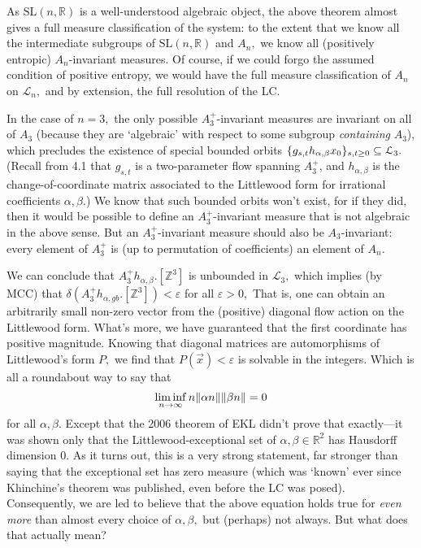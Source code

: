\documentclass[12pt, letterpaper, oneside]{book}
\newcommand{\ga}{\ensuremath{\alpha}}
\newcommand{\gb}{\ensuremath{\beta}}
\newcommand{\gd}{\ensuremath{\delta}}
\renewcommand{\ge}{\ensuremath{\varepsilon}}
\newcommand{\R}{\mathbb{R}}
\newcommand{\Z}{\mathbb{Z}}
\DeclarePairedDelimiter{\norm}{\lVert}{\rVert}
\DeclarePairedDelimiter{\set}{\lbrace}{\rbrace}
\theoremstyle{plain}
\theoremstyle{definition}
\theoremstyle{remark}
\begin{document}
As $\mbox{SL}(n,\R)$ is a well-understood algebraic object, the above theorem almost gives a full measure classification of the system: to the extent that we know all the intermediate subgroups of $\mbox{SL}(n,\R)$ and $A_n,$ we know all (positively entropic) $A_n$-invariant measures. Of course, if we could forgo the assumed condition of positive entropy, we would have the full measure classification of $A_n$ on $\mathcal{L}_n,$ and by extension, the full resolution of the LC. 

In the case of $n = 3,$ the only possible $A_3^{+}$-invariant measures are invariant on all of $A_3$ (because they are `algebraic' with respect to some subgroup \textit{containing} $A_3$), which precludes the existence of special bounded orbits $\set{g_{s,t}h_{\ga,\gb}x_0}_{s,t\geq0}  \subseteq \mathcal{L}_3.$ (Recall from 4.1 that $g_{s,t}$ is a two-parameter flow spanning $A_3^{+}$, and $h_{\ga,\gb}$ is the change-of-coordinate matrix associated to the Littlewood form for irrational coefficients $\ga,\gb.$) We know that such bounded orbits won't exist, for if they did, then it would be possible to define an $A_3^{+}$-invariant measure that is not algebraic in the above sense. But an $A_3^{+}$-invariant measure should also be $A_3$-invariant: every element of $A_3^{+}$ is (up to permutation of coefficients) an element of $A_n.$ 

We can conclude that $A_3^{+}h_{\ga,\gb}.[\Z^3]$ is unbounded in $\mathcal{L}_3,$ which implies (by MCC) that $\gd(A_3^{+} h_{\ga,gb}.[\Z^3]) < \ge$ for all $\ge>0,$ That is, one can obtain an arbitrarily small non-zero vector from the (positive) diagonal flow action on the Littlewood form. What's more, we have guaranteed that the first coordinate has positive magnitude. Knowing that diagonal matrices are automorphisms of Littlewood's form $P,$ we find that $P(\vec{x}) < \ge$ is solvable in the integers. Which is all a roundabout way to say that
\[
\liminf \limits_{n \to \infty} n \norm{\ga n} \norm {\gb n} = 0
\]
for all $\ga, \gb.$ Except that the 2006 theorem of EKL didn't prove that exactly---it was shown only that the Littlewood-exceptional set of $\ga, \gb \in \R^2$ has Hausdorff dimension 0. As it turns out, this is a very strong statement, far stronger than saying that the exceptional set has zero measure (which was `known' ever since Khinchine's theorem was published, even before the LC was posed). Consequently, we are led to believe that the above equation holds true for \textit{even more} than almost every choice of $\ga, \gb,$ but (perhaps) not always. But what does that actually mean? 
\end{document}
